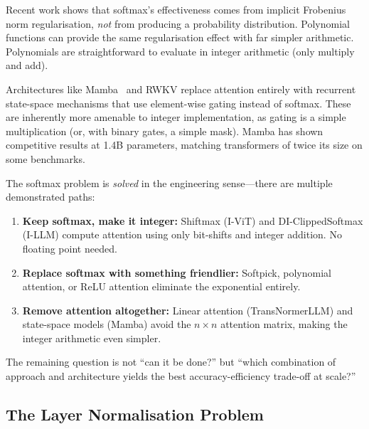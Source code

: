 \begin{description}[leftmargin=1em]
  \item[Polynomial attention~\cite{poly2024softmax}.]
    Recent work shows that softmax's effectiveness comes from
    implicit Frobenius norm regularisation, \emph{not} from
    producing a probability distribution. Polynomial functions
    can provide the same regularisation effect with far simpler
    arithmetic. Polynomials are straightforward to evaluate in
    integer arithmetic (only multiply and add).

  \item[Gated attention / state-space models.] Architectures like
    Mamba~\cite{gu2024mamba} and RWKV replace attention entirely
    with recurrent state-space mechanisms that use element-wise
    gating instead of softmax. These are inherently more amenable
    to integer implementation, as gating is a simple multiplication
    (or, with binary gates, a simple mask). Mamba has shown
    competitive results at 1.4B parameters, matching transformers
    of twice its size on some benchmarks.
\end{description}

\begin{keyinsight}
The softmax problem is \emph{solved} in the engineering sense---there
are multiple demonstrated paths:
\begin{enumerate}[leftmargin=1em]
  \item \textbf{Keep softmax, make it integer:} Shiftmax (I-ViT)
    and DI-ClippedSoftmax (I-LLM) compute attention using only
    bit-shifts and integer addition. No floating point needed.
  \item \textbf{Replace softmax with something friendlier:}
    Softpick, polynomial attention, or ReLU attention eliminate
    the exponential entirely.
  \item \textbf{Remove attention altogether:} Linear attention
    (TransNormerLLM) and state-space models (Mamba) avoid the
    $n \times n$ attention matrix, making the integer arithmetic
    even simpler.
\end{enumerate}
The remaining question is not ``can it be done?'' but ``which
combination of approach and architecture yields the best
accuracy-efficiency trade-off at scale?''
\end{keyinsight}

\subsection{The Layer Normalisation Problem}
\label{sec:layernorm-problem}

